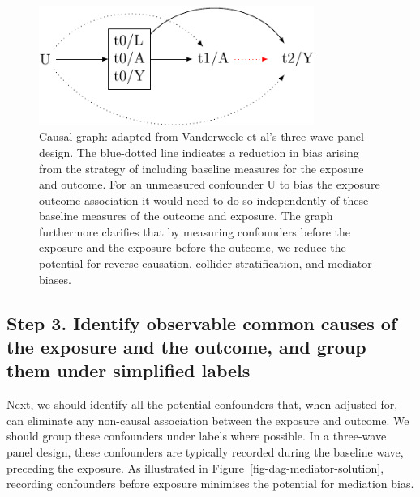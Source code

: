 \documentclass[
  singlecolumn]{report}
\begin{document}
\begin{figure}

{\centering \includegraphics[width=0.8\textwidth,height=\textheight]{causal-dags_files/figure-pdf/fig-dag-6-1.pdf}

}

\caption{\label{fig-dag-6}Causal graph: adapted from Vanderweele et al's
three-wave panel design. The blue-dotted line indicates a reduction in
bias arising from the strategy of including baseline measures for the
exposure and outcome. For an unmeasured confounder U to bias the
exposure outcome association it would need to do so independently of
these baseline measures of the outcome and exposure. The graph
furthermore clarifies that by measuring confounders before the exposure
and the exposure before the outcome, we reduce the potential for reverse
causation, collider stratification, and mediator biases.}

\end{figure}

\hypertarget{step-3.-identify-observable-common-causes-of-the-exposure-and-the-outcome-and-group-them-under-simplified-labels}{%
\subsection{Step 3. Identify observable common causes of the exposure
and the outcome, and group them under simplified
labels}\label{step-3.-identify-observable-common-causes-of-the-exposure-and-the-outcome-and-group-them-under-simplified-labels}}

Next, we should identify all the potential confounders that, when
adjusted for, can eliminate any non-causal association between the
exposure and outcome. We should group these confounders under labels
where possible. In a three-wave panel design, these confounders are
typically recorded during the baseline wave, preceding the exposure. As
illustrated in Figure~\ref{fig-dag-mediator-solution}, recording
confounders before exposure minimises the potential for mediation bias.
\end{document}
